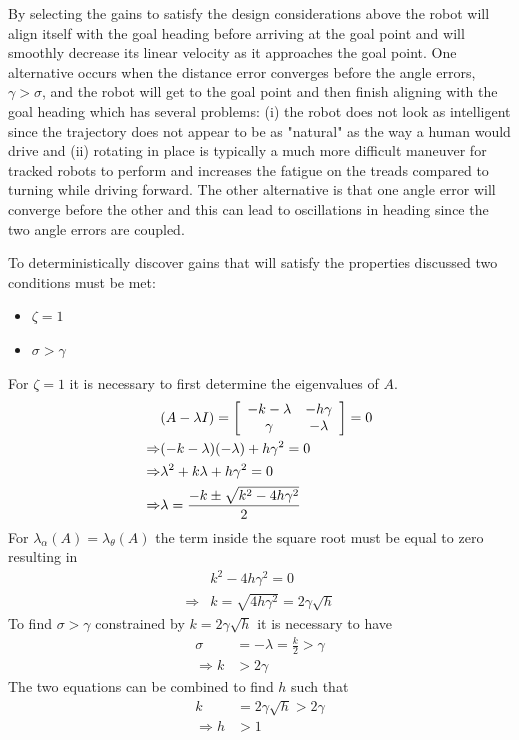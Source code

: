 By selecting the gains to satisfy the design considerations above the robot will align itself with the goal heading before arriving at the goal point and will smoothly decrease its linear velocity as it approaches the goal point. One alternative occurs when the distance error converges before the angle errors, $\gamma>\sigma$, and the robot will get to the goal point and then finish aligning with the goal heading which has several problems: (i) the robot does not look as intelligent since the trajectory does not appear to be as "natural" as the way a human would drive and (ii) rotating in place is typically a much more difficult maneuver for tracked robots to perform and increases the fatigue on the treads compared to turning while driving forward. The other alternative is that one angle error will converge before the other and this can lead to oscillations in heading since the two angle errors are coupled.

To deterministically discover gains that will satisfy the properties discussed two conditions must be met:
\begin{itemize}
\item $\zeta = 1$
\item $\sigma > \gamma$
\end{itemize}
For $\zeta=1$ it is necessary to first determine the eigenvalues of $A$.
\begin{align*}
&(A-\lambda I) = \left[\begin{array}{c c} -k-\lambda & -h\gamma \\ \gamma & -\lambda\end{array}\right] = 0 \\
\Rightarrow &(-k-\lambda)(-\lambda)+h\gamma^2 = 0 \\
\Rightarrow &\lambda^2 + k\lambda + h\gamma^2 = 0 \\
\Rightarrow &\lambda = \frac{-k\pm\sqrt{k^2-4h\gamma^2}}{2}
\end{align*}
For $\lambda_\alpha(A)=\lambda_\theta(A)$ the term inside the square root must be equal to zero resulting in
\begin{align*}
&k^2 - 4h\gamma^2 = 0 \\
\Rightarrow &k = \sqrt{4h\gamma^2} = 2\gamma\sqrt{h}
\end{align*}
To find $\sigma>\gamma$ constrained by $k=2\gamma\sqrt{h}$ it is necessary to have
\begin{align*}
\sigma &= -\lambda = \tfrac{k}{2} > \gamma \\
\Rightarrow k &> 2\gamma
\end{align*}
The two equations can be combined to find $h$ such that
\begin{align*}
k &= 2\gamma\sqrt{h} > 2\gamma \\
\Rightarrow h &> 1
\end{align*}

